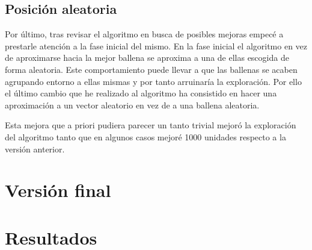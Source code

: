 \documentclass[12pt,a4paper]{article}
\begin{document}
    \subsection{Posición aleatoria}
    
    Por último, tras revisar el algoritmo en busca de posibles mejoras empecé a prestarle atención a la fase inicial del mismo. En la fase inicial el algoritmo en vez de aproximarse hacia la mejor ballena se aproxima a una de ellas escogida de forma aleatoria. Este comportamiento puede llevar a que las ballenas se acaben agrupando entorno a ellas mismas y por tanto arruinaría la exploración. Por ello el último cambio que he realizado al algoritmo ha consistido en hacer una aproximación a un vector aleatorio en vez de a una ballena aleatoria.
    
    Esta mejora que a priori pudiera parecer un tanto trivial mejoró la exploración del algoritmo tanto que en algunos casos mejoré 1000 unidades respecto a la versión anterior.
    
	
	\section{Versión final}
	\label{sec:versionFinal}
	
	\section{Resultados}
	\label{sec:resultados}
	
	
	
	
	\newpage
	
\end{document}
